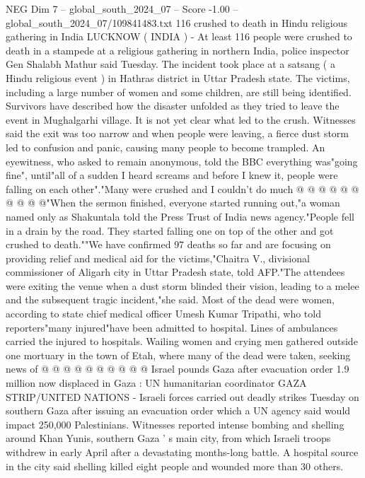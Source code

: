 \begin{textsample}{NEG Dim 7 – global\_south\_2024\_07 – Score -1.00 – global\_south\_2024\_07/109841483.txt}  \label{ex:f7_neg_347}
116 crushed to death in Hindu religious gathering in India LUCKNOW ( INDIA ) - At least 116 people were crushed to death in a stampede at a religious gathering in northern India, police inspector Gen Shalabh Mathur said Tuesday.
The incident took place at a satsang ( a Hindu religious event ) in Hathras district in Uttar Pradesh state.
The victims, including a large number of women and some children, are still being identified.
Survivors have described how the disaster unfolded as they tried to leave the event in Mughalgarhi village.
It is not yet clear what led to the crush.
Witnesses said the exit was too narrow and when people were leaving, a fierce dust storm led to confusion and panic, causing many people to become trampled.
An eyewitness, who asked to remain anonymous, told the BBC everything was"going fine", until"all of a sudden I heard screams and before I knew it, people were falling on each other"."Many were crushed and I couldn't do much @ @ @ @ @ @ @ @ @ @"When the sermon finished, everyone started running out,"a woman named only as Shakuntala told the Press Trust of India news agency."People fell in a drain by the road.
They started falling one on top of the other and got crushed to death.""We have confirmed 97 deaths so far and are focusing on providing relief and medical aid for the victims,"Chaitra V., divisional commissioner of Aligarh city in Uttar Pradesh state, told AFP."The attendees were exiting the venue when a dust storm blinded their vision, leading to a melee and the subsequent tragic incident,"she said.
Most of the dead were women, according to state chief medical officer Umesh Kumar Tripathi, who told reporters"many injured"have been admitted to hospital.
Lines of ambulances carried the injured to hospitals.
Wailing women and crying men gathered outside one mortuary in the town of Etah, where many of the dead were taken, seeking news of @ @ @ @ @ @ @ @ @ @ Israel pounds Gaza after evacuation order 1.9 million now displaced in Gaza : UN humanitarian coordinator GAZA STRIP/UNITED NATIONS - Israeli forces carried out deadly strikes Tuesday on southern Gaza after issuing an evacuation order which a UN agency said would impact 250,000 Palestinians.
Witnesses reported intense bombing and shelling around Khan Yunis, southern Gaza ' s main city, from which Israeli troops withdrew in early April after a devastating months-long battle.
A hospital source in the city said shelling killed eight people and wounded more than 30 others.

\end{textsample}
